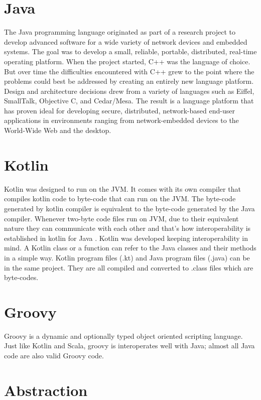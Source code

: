 \documentclass[12pt]{book}
\begin{document}
{{{\section{Java}
The Java programming language originated as part of a research project to develop advanced software for a wide variety of network devices and embedded systems. The goal was to develop a small, reliable, portable, distributed, real-time operating platform. When the project started, C++ was the language of choice. But over time the difficulties encountered with C++ grew to the point where the problems could best be addressed by creating an entirely new language platform. Design and architecture decisions drew from a variety of languages such as Eiffel, SmallTalk, Objective C, and Cedar/Mesa. The result is a language platform that has proven ideal for developing secure, distributed, network-based end-user applications in environments ranging from network-embedded devices to the World-Wide Web and the desktop. 

\section{Kotlin}
Kotlin was designed to run on the JVM. It comes with its own compiler that compiles kotlin code to byte-code that can run on the JVM. The byte-code generated by kotlin compiler is equivalent to the byte-code generated by the Java compiler. Whenever two-byte code files run on JVM, due to their equivalent nature they can communicate with each other and that’s how interoperability is established in kotlin for Java . Kotlin was developed keeping interoperability in mind. A Kotlin class or a function can refer to the Java classes and their methods in a simple way. Kotlin program files (.kt) and Java program files (.java) can be in the same project. They are all compiled and converted to .class files which are byte-codes.

\section{Groovy}
Groovy is a dynamic and optionally typed object oriented scripting language. Just like Kotlin and Scala, groovy is interoperates well with Java; almost all Java code are also valid Groovy code.

\section{Abstraction}

}}}
\end{document}
